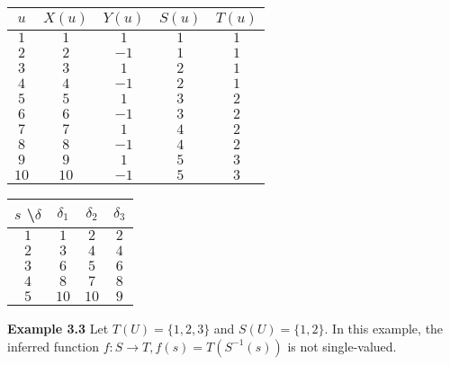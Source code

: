 \documentclass[11pt]{article}
\begin{document}
 \begin{center}
 \begin{tabular}{ |c||c|c|c|c| } 

 \hline
 $ u $ & $ X(u) $ & $ Y(u) $ & $ S(u) $ & $ T(u) $ \\ 
 \hline
 \hline
 $ 1 $ & $ 1 $ & $ 1 $ & $ 1 $ & $ 1 $ \\
 \hline
 $ 2 $ & $ 2 $ & $ -1 $ & $ 1 $ & $ 1 $ \\
 \hline
 $ 3 $ & $ 3 $ & $ 1 $ & $ 2 $ & $ 1 $ \\
 \hline
 $ 4 $ & $ 4 $ & $ -1 $ & $ 2 $ & $ 1 $ \\
 \hline
 $ 5 $ & $ 5 $ & $ 1 $ & $ 3 $ & $ 2 $ \\
 \hline
 $ 6 $ & $ 6 $ & $ -1 $ & $ 3 $ & $ 2 $ \\
 \hline
 $ 7 $ & $ 7 $ & $ 1 $ & $ 4 $ & $ 2 $ \\
 \hline
 $ 8 $ & $ 8 $ & $ -1 $ & $ 4 $ & $ 2 $ \\
 \hline
 $ 9 $ & $ 9 $ & $ 1 $ & $ 5 $ & $ 3 $ \\
 \hline
 $ 10 $ & $ 10 $ & $ -1 $ & $ 5 $ & $ 3 $ \\
 \hline 
 \end{tabular} 
 \quad
 \begin{tabular}{ |c||c|c|c| } 

 \hline
 $ s $ \textbackslash $ \delta $ & $ \delta_1 $ & $ \delta_2 $ & $ \delta_3 $  \\ 
 \hline
 \hline
 $ 1 $ & $ 1 $ & $ 2 $ & $ 2 $ \\
 \hline
 $ 2 $ & $ 3 $ & $ 4 $ & $ 4 $ \\
 \hline
 $ 3 $ & $ 6 $ & $ 5 $ & $ 6 $ \\
 \hline
 $ 4 $ & $ 8 $ & $ 7 $ & $ 8 $ \\
 \hline 
 $ 5 $ & $ 10 $ & $ 10 $ & $ 9 $ \\
 \hline
 
 \end{tabular}
 \end{center} 

 \bigskip
 \bigskip 
 \textbf{Example 3.3} \quad Let $ T(U) = \{1, 2, 3\} $ and $ S(U) = \{1, 2\} $. In this example, the inferred function $ f: S \rightarrow T, f(s) = T(S^{-1}(s)) $ is not single-valued. \\ 
\end{document}

